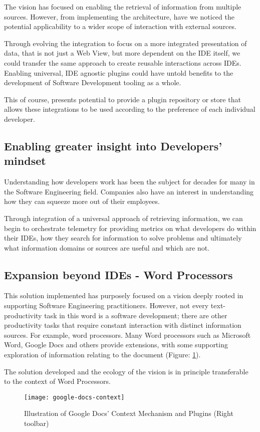 The vision has focused on enabling the retrieval of information from multiple sources. However, from implementing the architecture, have we noticed the potential applicability to a wider scope of interaction with external sources.

Through evolving the integration to focus on a more integrated presentation of data, that is not just a Web View, but more dependent on the IDE itself, we could transfer the same approach to create reusable interactions across IDEs. Enabling universal, IDE agnostic plugins could have untold benefits to the development of Software Development tooling as a whole. 

This of course, presents potential to provide a plugin repository or store that allows these integrations to be used according to the preference of each individual developer.

\subsection{Enabling greater insight into Developers' mindset}

Understanding how developers work has been the subject for decades for many in the Software Engineering field. Companies also have an interest in understanding how they can squeeze more out of their employees.

Through integration of a universal approach of retrieving information, we can begin to orchestrate telemetry for providing metrics on what developers do within their IDEs, how they search for information to solve problems and ultimately what information domains or sources are useful and which are not. 

\subsection{Expansion beyond IDEs - Word Processors}

This solution implemented has purposely focused on a vision deeply rooted in supporting Software Engineering practitioners. However, not every text-productivity task in this word is a software development; there are other productivity tasks that require constant interaction with distinct information sources. For example, word processors. Many Word processors such as Microsoft Word, Google Docs and others provide extensions, with some supporting exploration of information relating to the document (Figure: \ref{fig:google-docs-context}). 

The solution developed and the ecology of the vision is in principle transferable to the context of Word Processors.

\begin{figure}[h!]
	\centering
	\texttt{[image: google-docs-context]}
	\caption{Illustration of Google Docs' Context Mechanism and Plugins (Right toolbar)}
	\label{fig:google-docs-context}
\end{figure}


